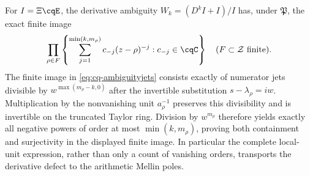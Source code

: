 For $I=\Xi\cqE$, the derivative ambiguity
$W_k=(D^kI+I)/I$ has, under $\mathfrak P$, the exact finite image
\begin{equation}\label{eq:cq-principal-ambiguity}
 \prod_{\rho\in F}
 \left\{\sum_{j=1}^{\min(k,m_\rho)}c_{-j}(z-\rho)^{-j}:c_{-j}\in\cqC\right\}
 \quad(F\subset\mathcal Z\text{ finite}).
\end{equation}
The finite image in \eqref{eq:cq-ambiguityjets} consists exactly
of numerator jets divisible by $w^{\max(m_\rho-k,0)}$ after
the invertible substitution $s-\lambda_\rho=iw$.
Multiplication by the nonvanishing unit $a_\rho^{-1}$ preserves
this divisibility and is invertible on the truncated Taylor ring.
Division by $w^{m_\rho}$ therefore yields exactly all negative
powers of order at most $\min(k,m_\rho)$, proving both
containment and surjectivity in the displayed finite image.
In particular the complete local-unit expression, rather than only
a count of vanishing orders, transports the derivative defect to
the arithmetic Mellin poles.

